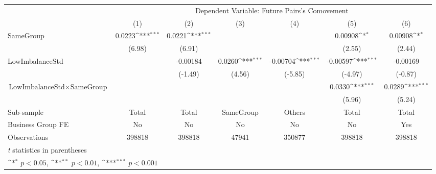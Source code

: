 {
\def\sym#1{\ifmmode^{#1}\else\(^{#1}\)\fi}
\begin{tabular}{l*{6}{c}}
\hline\hline
                    &\multicolumn{6}{c}{Dependent Variable:  Future Pairs's Comovement}                                                                 \\\cmidrule(lr){2-7}
                    &\multicolumn{1}{c}{(1)}         &\multicolumn{1}{c}{(2)}         &\multicolumn{1}{c}{(3)}         &\multicolumn{1}{c}{(4)}         &\multicolumn{1}{c}{(5)}         &\multicolumn{1}{c}{(6)}         \\
\hline
SameGroup           &      0.0223\sym{***}&      0.0221\sym{***}&                     &                     &     0.00908\sym{*}  &     0.00908\sym{*}  \\
                    &      (6.98)         &      (6.91)         &                     &                     &      (2.55)         &      (2.44)         \\
[1em]
LowImbalanceStd     &                     &    -0.00184         &      0.0260\sym{***}&    -0.00704\sym{***}&    -0.00597\sym{***}&    -0.00169         \\
                    &                     &     (-1.49)         &      (4.56)         &     (-5.85)         &     (-4.97)         &     (-0.87)         \\
[1em]
 $ \text{LowImbalanceStd} \times {\text{SameGroup} } $ &                     &                     &                     &                     &      0.0330\sym{***}&      0.0289\sym{***}\\
                    &                     &                     &                     &                     &      (5.96)         &      (5.24)         \\
\hline
Sub-sample          &       Total         &       Total         &   SameGroup         &      Others         &       Total         &       Total         \\
Business Group FE   &          No         &          No         &          No         &          No         &          No         &         Yes         \\
Observations        &      398818         &      398818         &       47941         &      350877         &      398818         &      398818         \\
\hline\hline
\multicolumn{7}{l}{\footnotesize \textit{t} statistics in parentheses}\\
\multicolumn{7}{l}{\footnotesize \sym{*} \(p<0.05\), \sym{**} \(p<0.01\), \sym{***} \(p<0.001\)}\\
\end{tabular}
}
